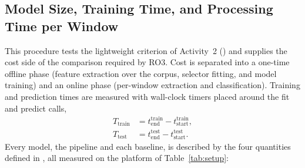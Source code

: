 \subsection{Model Size, Training Time, and Processing Time per Window}
\label{sec:chap3Efficiency}
This procedure tests the lightweight criterion of Activity~2 () and supplies the cost side of the comparison required by RO3. Cost is separated into a one-time offline phase (feature extraction over the corpus, selector fitting, and model training) and an online phase (per-window extraction and classification). Training and prediction times are measured with wall-clock timers placed around the fit and predict calls,
\begin{align}
	T_{\mathrm{train}} &= t^{\mathrm{train}}_{\mathrm{end}} - t^{\mathrm{train}}_{\mathrm{start}},\\[1ex]
	T_{\mathrm{test}}  &= t^{\mathrm{test}}_{\mathrm{end}} - t^{\mathrm{test}}_{\mathrm{start}}.
\end{align}
Every model, the pipeline and each baseline, is described by the four quantities defined in , all measured on the platform of Table~\ref{tab:setup}:
